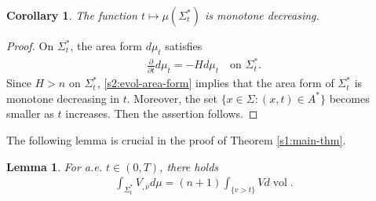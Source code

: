 \documentclass[11pt,reqno]{amsart}
\newtheorem{cor}[thm]{Corollary}
\newtheorem{lem}[thm]{Lemma}
\theoremstyle{definition}
\theoremstyle{remark}
\numberwithin{equation}{section}
\renewcommand{\(}{\left(}
\renewcommand{\)}{\right)}
\renewcommand{\~}{\widetilde}
\renewcommand{\-}{\overline}
\newcommand{\vol}{\operatorname{vol}}
\begin{document}
\begin{cor}\label{s3:cor-area-decreasing}
	The function $t\mapsto \mu(\Sigma_t^\ast)$ is monotone decreasing.
\end{cor}
\begin{proof}
	On $\Sigma_t^\ast$, the area form $d\mu_t$ satisfies
	\begin{align}\label{s2:evol-area-form}
	\frac{\partial}{\partial t} d\mu_t=-H d\mu_t  \quad \text{on $\Sigma_t^\ast$}.
	\end{align}	
	Since $H>n$ on $\Sigma_t^\ast$, \eqref{s2:evol-area-form} implies that the area form of $\Sigma_t^\ast$ is monotone decreasing in $t$. Moreover, the set $\{x\in \Sigma:(x,t)\in A^\ast\}$ becomes smaller as $t$ increases. Then the assertion follows.
\end{proof}

The following lemma is crucial in the proof of Theorem \ref{s1:main-thm}.
\begin{lem}\label{s3:prop-identity}
	For a.e. $t\in (0,T)$, there holds
	\begin{align}\label{s3.eq3-4}
	\int_{\Sigma_t^\ast} V_{,\nu} d\mu=(n+1)\int_{\{v>t\}} V d\vol.
	\end{align}
\end{lem}
\end{document}
